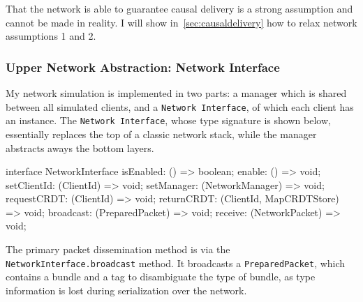 \documentclass[12pt,a4paper,twoside,openright]{report}
\begin{document}
		That the network is able to guarantee causal delivery is a strong assumption and cannot be made in reality. I will show in~\cref{sec:causaldelivery} how to relax network assumptions 1 and 2.
		

		\subsubsection{Upper Network Abstraction: Network Interface} \label{sec:network:networkinterface}
		My network simulation is implemented in two parts: a manager which is shared between all simulated clients, and a \texttt{Network Interface}, of which each client has an instance. The \texttt{Network Interface}, whose type signature is shown below, essentially replaces the top of a classic network stack, while the manager abstracts aways the bottom layers.
		
\begin{typescript}
interface NetworkInterface {
	isEnabled: () => boolean;
	enable: () => void;
	setClientId: (ClientId) => void;
	setManager: (NetworkManager) => void;
	requestCRDT: (ClientId) => void;
	returnCRDT: (ClientId, MapCRDTStore) => void;
	broadcast: (PreparedPacket) => void;
	receive: (NetworkPacket) => void;
}
\end{typescript}

		The primary packet dissemination method is via the \texttt{NetworkInterface.broadcast} method. It broadcasts a \texttt{PreparedPacket}, which contains a bundle and a tag to disambiguate the type of bundle, as type information is lost during serialization over the network.
\end{document}
